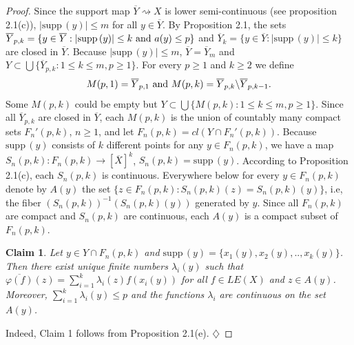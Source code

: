 \documentclass[12pt]{amsart}
\newtheorem{claim}{Claim}
\def\supp{{\mathrm {supp}}\,}
\begin{document}
\begin{proof}
Since the support map $\overline Y\rightsquigarrow X$ is lower semi-continuous (see proposition 2.1(c)), $|\supp(y)|\leq m$ for all $y\in\overline Y$. 
By Proposition 2.1, the sets $\overline Y_{p,k}=\{y\in\overline Y:|\supp(y)|\leq k{~}\hbox{and}{~}a(y)\leq p\}$ and $\overline Y_k=\{y\in\overline Y:|\supp(y)|\leq k\}$ are closed in $\overline Y$. Because $|\supp(y)|\leq m$, $\overline Y=\overline Y_{m}$ and $Y\subset\bigcup\{\overline Y_{p,k}:1\leq k\leq m, p\geq 1\}$. For every $p\geq 1$ and $k\geq 2$ we define 
$$M(p,1)=\overline Y_{p,1}{~}\hbox{and}{~}M(p,k)=\overline Y_{p,k}\backslash\overline Y_{p,k-1}.$$
Some $M(p,k)$ could be empty but $Y\subset\bigcup\{M(p,k):1\leq k\leq m, p\geq 1\}$. Since all $\overline Y_{p,k}$ are closed in $\overline Y$, each
$M(p,k)$ is the union of countably many compact sets $F_n'(p,k)$, $n\geq 1$, and let $F_n(p,k)=cl(Y\cap F_n'(p,k))$.   
Because $\supp(y)$ consists of $k$ different points for any $y\in F_n(p,k)$, we have a map $S_n(p,k):F_n(p,k)\to [\overline X]^k$, 
$S_n(p,k)=\supp(y)$. %
According to Proposition 2.1(c), each $S_n(p,k)$ is continuous.
 Everywhere below for every $y\in F_n(p,k)$ denote by $A(y)$ the set $\{z\in F_n(p,k):S_n(p,k)(z)=S_n(p,k)(y)\}$, i.e, the fiber $(S_n(p,k))^{-1}(S_n(p,k)(y))$ generated by $y$. Since all $F_n(p,k)$ are compact and $S_n(p,k)$ are continuous, each $A(y)$ is a  compact subset of $F_n(p,k)$. 
\begin{claim}
Let $y\in Y\cap F_n(p,k)$ and $\supp(y)=\{x_1(y),x_2(y),..,x_k(y)\}$. Then  
there exist unique finite numbers $\lambda_i(y)$ such that $\overline{\varphi(f)}(z)=\sum_{i=1}^k\lambda_i(z)f(x_i(y))$ for all $f\in LE(X)$ and $z\in A(y)$.
 Moreover, $\sum_{i=1}^k\lambda_i(y)\leq p$ and the functions $\lambda_i$ are continuous on the set $A(y)$.
\end{claim}
Indeed, Claim 1 follows from Proposition 2.1(e). $\diamondsuit$


\end{proof}
\end{document}
